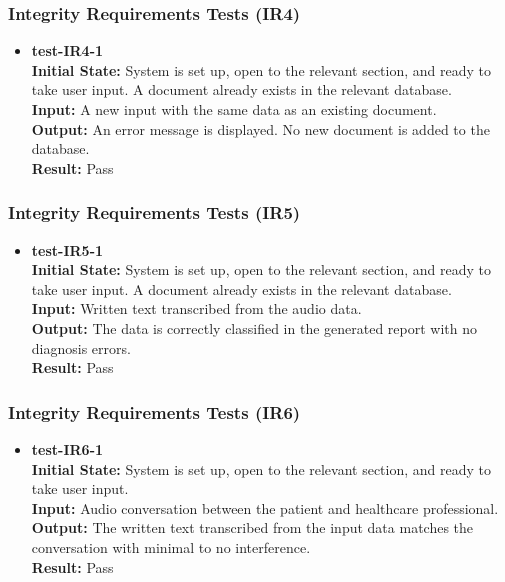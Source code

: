 \documentclass[12pt, titlepage]{article}
\begin{document}
\subsubsection{Integrity Requirements Tests (IR4)} \label{section:4.10.6}

\begin{itemize}
\item \textbf{test-IR4-1} \label{test-IR4-1} \\
\textbf{Initial State:} System is set up, open to the relevant section, and ready to take user input. A document already exists in the relevant database. \\
\textbf{Input:} A new input with the same data as an existing document. \\
\textbf{Output:} An error message is displayed. No new document is added to the database. \\
\textbf{Result:} Pass \\
\end{itemize}

\subsubsection{Integrity Requirements Tests (IR5)} \label{section:4.10.7}

\begin{itemize}
\item \textbf{test-IR5-1} \label{test-IR5-1} \\
\textbf{Initial State:} System is set up, open to the relevant section, and ready to take user input. A document already exists in the relevant database. \\
\textbf{Input:} Written text transcribed from the audio data. \\
\textbf{Output:} The data is correctly classified in the generated report with no diagnosis errors. \\
\textbf{Result:} Pass \\
\end{itemize}

\subsubsection{Integrity Requirements Tests (IR6)} \label{section:4.10.8}

\begin{itemize}
\item \textbf{test-IR6-1} \label{test-IR6-1} \\
\textbf{Initial State:} System is set up, open to the relevant section, and ready to take user input. \\
\textbf{Input:} Audio conversation between the patient and healthcare professional. \\
\textbf{Output:} The written text transcribed from the input data matches the conversation with minimal to no interference. \\
\textbf{Result:} Pass \\
\end{itemize}
\end{document}
